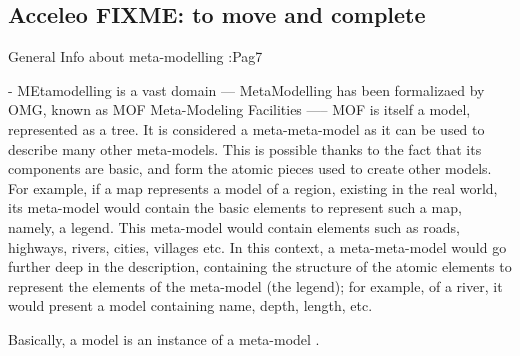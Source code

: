 \subsection{Acceleo FIXME: to move and complete}
\label{acceleo}

General Info about meta-modelling   :Pag7 \cite{AcceleoUserGuide}

- MEtamodelling is a vast domain
--- MetaModelling has been formalizaed by OMG, known as MOF Meta-Modeling Facilities
----- MOF is itself a model, represented as a tree. It is considered a meta-meta-model as it can be used to describe many other meta-models. This is possible thanks to the fact that its components are basic, and form the atomic pieces used to create other models. 
For example, if a map represents a model of a region, existing in the real world, its meta-model would contain the basic elements to represent such a map, namely, a legend. This meta-model would contain elements such as roads, highways, rivers, cities, villages etc. In this context, a meta-meta-model would go further deep in the description, containing the structure of the atomic elements to represent the elements of the meta-model (the legend); for example, of a river, it would present a model containing name, depth, length, etc.  

Basically, a model is an instance of a meta-model \cite{UnderstandMetamodelling}. 


